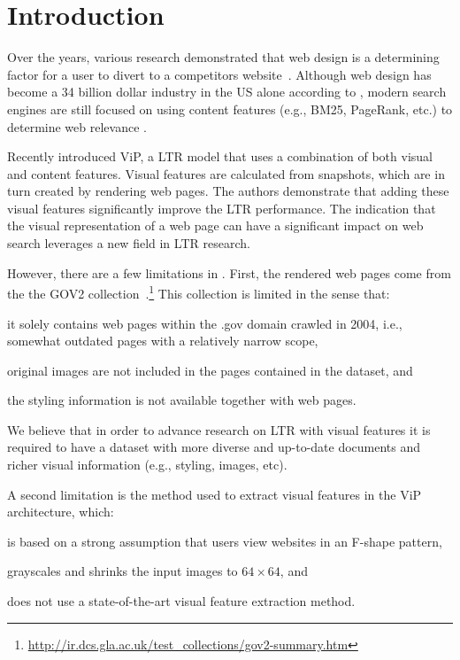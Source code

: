 
\section{Introduction}
Over the years, various research demonstrated that web design is a determining factor for a user to divert to a competitors website~\cite{nielsen1999designing,nielsen2006f,pernice2017f,wang2014eye}.
Although web design has become a 34 billion dollar industry in the US alone according to \citet{ibisdesign}, modern search engines are still focused on using content features (e.g., BM25, PageRank, etc.) to determine web relevance . 

Recently \citet{fan2017learning} introduced ViP, a \ac{LTR} model that uses a combination of both visual and content features.
Visual features are calculated from snapshots, which are in turn created by rendering web pages.
The authors demonstrate that adding these visual features significantly improve the \ac{LTR} performance.
The indication that the visual representation of a web page can have a significant impact on web search leverages a new field in \ac{LTR} research.

However, there are a few limitations in \cite{fan2017learning}.
First, the rendered web pages come from the the GOV2 collection~.\footnote{\url{http://ir.dcs.gla.ac.uk/test_collections/gov2-summary.htm}}
This collection is limited in the sense that:
\begin{inparaenum}[(i)]
\item it solely contains web pages within the .gov domain crawled in 2004, i.e., somewhat outdated pages with a relatively narrow scope,
\item original images are not included in the pages contained in the dataset, and
\item the styling information is not available together with web pages.
\end{inparaenum}
We believe that in order to advance research on \ac{LTR} with visual features it is required to have a dataset with more diverse and up-to-date documents and richer visual information (e.g., styling, images, etc).

A second limitation is the method used to extract visual features in the ViP architecture, which: 
\begin{inparaenum}[(i)]
\item is based on a strong assumption that users view websites in an F-shape pattern, 
\item grayscales and shrinks the input images to $64\times64$, and
\item does not use a state-of-the-art visual feature extraction method.
\end{inparaenum}

